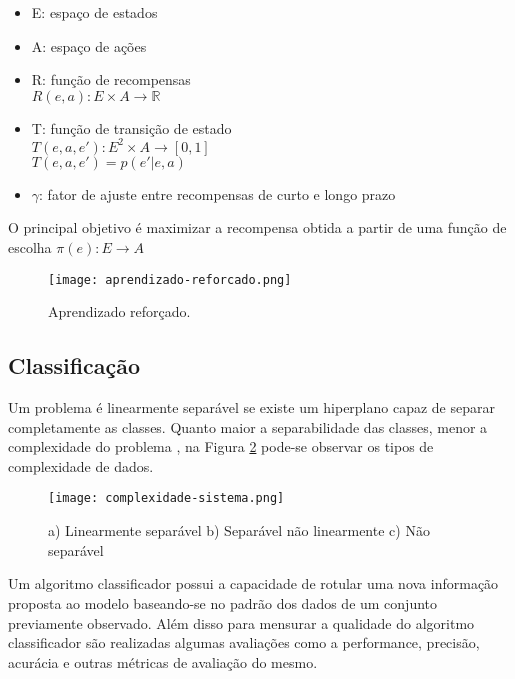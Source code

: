 \begin{itemize}
    \item E:  espaço de estados
    \item A:  espaço de ações
    \item R:  função de recompensas \\
    $R(e,a): E \times A \rightarrow \mathbb{R}$
    \item T:  função de transição de estado \\ 
    $T(e,a,e'): E^2 \times A \rightarrow [0,1]$ \\
    $T(e,a,e') = p(e'|e,a)$
    \item $\gamma$: fator de ajuste entre recompensas de curto e longo prazo
\end{itemize}


O principal objetivo é maximizar a recompensa obtida a partir de uma função de escolha $\pi(e): E \rightarrow A$

\begin{figure}[ht]
    \centering
    \texttt{[image: aprendizado-reforcado.png]} 
    \caption{ Aprendizado reforçado.}
    \label{fig:aprendizado-reforcado}
\end{figure}
\FloatBarrier


\subsection{Classificação}\label{sec:LABEL_CHP_4_SEC_A_SUB_D}


Um problema é linearmente separável se existe um hiperplano capaz de separar completamente as classes. Quanto maior a separabilidade das classes, menor a complexidade do problema \cite{smola2008introduction}, na Figura \ref{fig:complexidade-sistema} pode-se observar os tipos de complexidade de dados.

\begin{figure}[ht]
    \centering
    \texttt{[image: complexidade-sistema.png]} 
    \caption{ a) Linearmente separável b) Separável não linearmente c) Não separável}
    \label{fig:complexidade-sistema}
\end{figure}
\FloatBarrier

Um algoritmo classificador possui a capacidade de rotular uma nova informação proposta ao modelo baseando-se no padrão dos dados de um conjunto previamente observado. Além disso para mensurar a qualidade do algoritmo classificador são realizadas algumas avaliações como a performance, precisão, acurácia e outras métricas de avaliação do mesmo.




